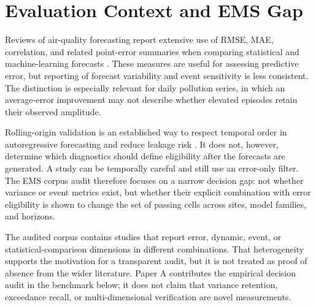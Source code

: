 \section{Evaluation Context and EMS Gap}
\label{sec:background}

Reviews of air-quality forecasting report extensive use of RMSE, MAE, correlation, and related point-error summaries when comparing statistical and machine-learning forecasts \cite{mendez2023,tang2024,chadalavada2025}. These measures are useful for assessing predictive error, but reporting of forecast variability and event sensitivity is less consistent. The distinction is especially relevant for daily pollution series, in which an average-error improvement may not describe whether elevated episodes retain their observed amplitude.

Rolling-origin validation is an established way to respect temporal order in autoregressive forecasting and reduce leakage risk \cite{tashman2000,bergmeir2018}. It does not, however, determine which diagnostics should define eligibility after the forecasts are generated. A study can be temporally careful and still use an error-only filter. The EMS corpus audit therefore focuses on a narrow decision gap: not whether variance or event metrics exist, but whether their explicit combination with error eligibility is shown to change the set of passing cells across sites, model families, and horizons.

The audited corpus contains studies that report error, dynamic, event, or statistical-comparison dimensions in different combinations. That heterogeneity supports the motivation for a transparent audit, but it is not treated as proof of absence from the wider literature. Paper A contributes the empirical decision audit in the benchmark below; it does not claim that variance retention, exceedance recall, or multi-dimensional verification are novel measurements.
